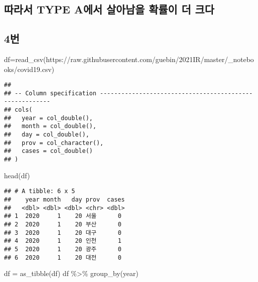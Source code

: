 \documentclass[
  12pt,
]{article}
\newenvironment{Shaded}{\begin{snugshade}}{\end{snugshade}}
\newcommand{\FunctionTok}[1]{\textcolor[rgb]{0.00,0.00,0.00}{#1}}
\newcommand{\NormalTok}[1]{#1}
\newcommand{\OtherTok}[1]{\textcolor[rgb]{0.56,0.35,0.01}{#1}}
\newcommand{\SpecialCharTok}[1]{\textcolor[rgb]{0.00,0.00,0.00}{#1}}
\newcommand{\StringTok}[1]{\textcolor[rgb]{0.31,0.60,0.02}{#1}}
\begin{document}
\hypertarget{uxb530uxb77cuxc11c-type-auxc5d0uxc11c-uxc0b4uxc544uxb0a8uxc744-uxd655uxb960uxc774-uxb354-uxd06cuxb2e4}{%
\subsection{따라서 TYPE A에서 살아남을 확률이 더
크다}\label{uxb530uxb77cuxc11c-type-auxc5d0uxc11c-uxc0b4uxc544uxb0a8uxc744-uxd655uxb960uxc774-uxb354-uxd06cuxb2e4}}

\hypertarget{uxbc88-4}{%
\subsection{4번}\label{uxbc88-4}}

\begin{Shaded}
\begin{Highlighting}[]
\NormalTok{df}\OtherTok{=}\FunctionTok{read\_csv}\NormalTok{(}\StringTok{\textquotesingle{}https://raw.githubusercontent.com/guebin/2021IR/master/\_notebooks/covid19.csv\textquotesingle{}}\NormalTok{)}
\end{Highlighting}
\end{Shaded}

\begin{verbatim}
## 
## -- Column specification --------------------------------------------------------
## cols(
##   year = col_double(),
##   month = col_double(),
##   day = col_double(),
##   prov = col_character(),
##   cases = col_double()
## )
\end{verbatim}

\begin{Shaded}
\begin{Highlighting}[]
\FunctionTok{head}\NormalTok{(df)}
\end{Highlighting}
\end{Shaded}

\begin{verbatim}
## # A tibble: 6 x 5
##    year month   day prov  cases
##   <dbl> <dbl> <dbl> <chr> <dbl>
## 1  2020     1    20 서울      0
## 2  2020     1    20 부산      0
## 3  2020     1    20 대구      0
## 4  2020     1    20 인천      1
## 5  2020     1    20 광주      0
## 6  2020     1    20 대전      0
\end{verbatim}

\begin{Shaded}
\begin{Highlighting}[]
\NormalTok{df }\OtherTok{=} \FunctionTok{as\_tibble}\NormalTok{(df)}
\NormalTok{df }\SpecialCharTok{\%\textgreater{}\%} \FunctionTok{group\_by}\NormalTok{(year)}
\end{Highlighting}
\end{Shaded}
\end{document}
